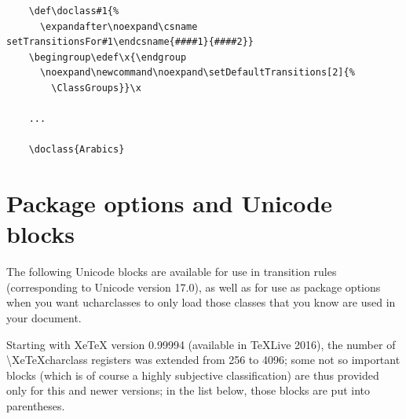 \documentclass{article}
\begin{document}
    \disableTransitionRules
    \begin{verbatim}
    \def\doclass#1{%
      \expandafter\noexpand\csname setTransitionsFor#1\endcsname{####1}{####2}}
    \begingroup\edef\x{\endgroup
      \noexpand\newcommand\noexpand\setDefaultTransitions[2]{%
        \ClassGroups}}\x

    ...

    \doclass{Arabics}
    \end{verbatim}
    \enableTransitionRules

  \pagebreak

  \section{Package options and Unicode blocks}

    The following Unicode blocks are available for use in transition rules (corresponding to Unicode version 17.0), as well as for use as package options when you want ucharclasses to only load those classes that you know are used in your document.

    Starting with XeTeX version 0.99994 (available in TeXLive 2016), the number of \textbackslash XeTeXcharclass registers was extended from 256 to 4096; some not so important blocks (which is of course a highly subjective classification) are thus provided only for this and newer versions; in the list below, those blocks are put into parentheses.
\end{document}
